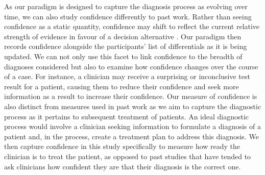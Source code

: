 \documentclass[a4paper, nobind]{templates/ociamthesis}
\begin{document}
\hfill\break
As our paradigm is designed to capture the diagnosis process as evolving over time, we can also study confidence differently to past work. Rather than seeing confidence as a static quantity, confidence may shift to reflect the current relative strength of evidence in favour of a decision alternative \autocite{vickers_effects_1982}. Our paradigm then records confidence alongside the participants' list of differentials as it is being updated. We can not only use this facet to link confidence to the breadth of diagnoses considered but also to examine how confidence changes over the course of a case. For instance, a clinician may receive a surprising or inconclusive test result for a patient, causing them to reduce their confidence and seek more information as a result to increase their confidence. Our measure of confidence is also distinct from measures used in past work as we aim to capture the diagnostic process as it pertains to subsequent treatment of patients. An ideal diagnostic process would involve a clinician seeking information to formulate a diagnosis of a patient and, in the process, create a treatment plan to address this diagnosis. We then capture confidence in this study specifically to measure how ready the clinician is to treat the patient, as opposed to past studies that have tended to ask clinicians how confident they are that their diagnosis is the correct one.
\end{document}
